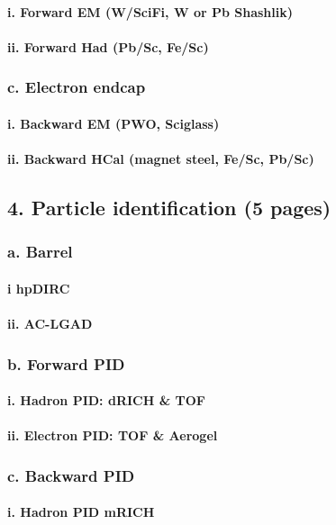 \documentclass{report}
\begin{document}
\paragraph{i. Forward EM (W/SciFi, W or Pb Shashlik)}
\paragraph{ii. Forward Had (Pb/Sc, Fe/Sc)}
\subsubsection{c. Electron endcap}
\paragraph{i. Backward EM (PWO, Sciglass)}
\paragraph{ii. Backward HCal (magnet steel, Fe/Sc, Pb/Sc)}
\subsection{4. Particle identification (5 pages)}
\subsubsection{a. Barrel}
\paragraph{i hpDIRC}
\paragraph{ii. AC-LGAD}
\subsubsection{b. Forward PID}
\paragraph{i. Hadron PID: dRICH & TOF}
\paragraph{ii. Electron PID: TOF & Aerogel}
\subsubsection{c. Backward PID}
\paragraph{i. Hadron PID mRICH}
\end{document}
